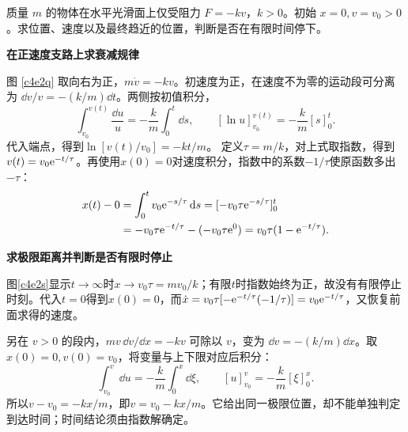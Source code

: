 \begin{question}
\begin{example}[线性阻力下的滑行]
质量 $m$ 的物体在水平光滑面上仅受阻力 $F=-kv$，$k>0$。初始 $x=0,v=v_0>0$。求位置、速度以及最终趋近的位置，判断是否在有限时间停下。
\end{example}
\end{question}
\begin{solution}\textbf{在正速度支路上求衰减规律}\par\nobreak
图 \ref{c4e2q} 取向右为正，$m\dot v=-kv$。初速度为正，在速度不为零的运动段可分离为 $\dd v/v=-(k/m)\dd t$。两侧按初值积分，
\[
\int_{v_0}^{v(t)}\frac{\dd u}{u}
=-\frac{k}{m}\int_0^t\dd s,\qquad
[\ln u]_{v_0}^{v(t)}=-\frac{k}{m}[s]_0^t.
\]
代入端点，得到$\ln[v(t)/v_0]=-kt/m$。
定义$\tau=m/k$，对上式取指数，得到$v(t)=v_0\mathrm e^{-t/\tau}$。再使用$x(0)=0$对速度积分，指数中的系数$-1/\tau$使原函数多出$-\tau$：
\begin{align*}
x(t)-0&=\int_0^t v_0\mathrm e^{-s/\tau}\mathop{}\!\mathrm d s
=[-v_0\tau\mathrm e^{-s/\tau}]_0^t\\
&=-v_0\tau\mathrm e^{-t/\tau}-(-v_0\tau\mathrm e^0)
=v_0\tau(1-\mathrm e^{-t/\tau}).
\end{align*}



\par\medskip{}\noindent\textbf{求极限距离并判断是否有限时停止}\par\nobreak
图\ref{c4e2s}显示$t\to\infty$时$x\to v_0\tau=mv_0/k$；有限$t$时指数始终为正，故没有有限停止时刻。代入$t=0$得到$x(0)=0$，而$\dot x=v_0\tau[-\mathrm e^{-t/\tau}(-1/\tau)]=v_0\mathrm e^{-t/\tau}$，又恢复前面求得的速度。

另在 $v>0$ 的段内，$m v\,\dd v/\dd x=-kv$ 可除以 $v$，变为 $\dd v=-(k/m)\dd x$。取$x(0)=0,v(0)=v_0$，将变量与上下限对应后积分：
\[
\int_{v_0}^{v}\dd u=-\frac{k}{m}\int_0^x\dd \xi,
\qquad
[u]_{v_0}^{v}=-\frac{k}{m}[\xi]_0^x.
\]
所以$v-v_0=-kx/m$，即$v=v_0-kx/m$。它给出同一极限位置，却不能单独判定到达时间；时间结论须由指数解确定。
\end{solution}

